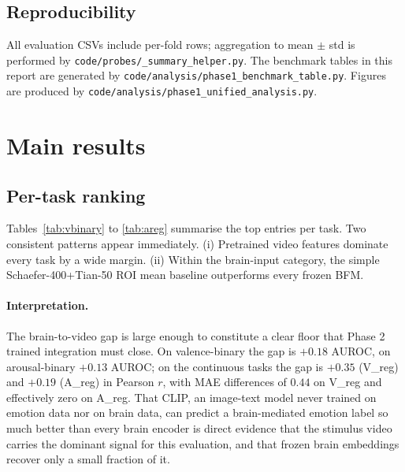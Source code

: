 \documentclass[11pt, a4paper]{article}
\newcommand{\fefn}[1]{\texttt{\small #1}}
\begin{document}
\subsection{Reproducibility}
All evaluation CSVs include per-fold rows; aggregation to mean $\pm$ std is performed by
\fefn{code/probes/\_summary\_helper.py}. The benchmark tables in this report are generated
by \fefn{code/analysis/phase1\_benchmark\_table.py}. Figures are produced by
\fefn{code/analysis/phase1\_unified\_analysis.py}.

\clearpage

\section{Main results}

\subsection{Per-task ranking}

Tables~\ref{tab:vbinary} to \ref{tab:areg} summarise the top entries per task. Two
consistent patterns appear immediately. (i) Pretrained video features dominate every task
by a wide margin. (ii) Within the brain-input category, the simple
Schaefer-400+Tian-50 ROI mean baseline outperforms every frozen BFM.

\paragraph{Interpretation.}
The brain-to-video gap is large enough to constitute a clear floor that Phase 2 trained
integration must close. On valence-binary the gap is $+0.18$ AUROC, on arousal-binary
$+0.13$ AUROC; on the continuous tasks the gap is $+0.35$ (V\_reg) and $+0.19$ (A\_reg) in
Pearson $r$, with MAE differences of $0.44$ on V\_reg and effectively zero on A\_reg.
That CLIP, an image-text model never trained on emotion data nor on brain data, can
predict a brain-mediated emotion label so much better than every brain encoder is direct
evidence that the stimulus video carries the dominant signal for this evaluation, and that
frozen brain embeddings recover only a small fraction of it.
\end{document}
